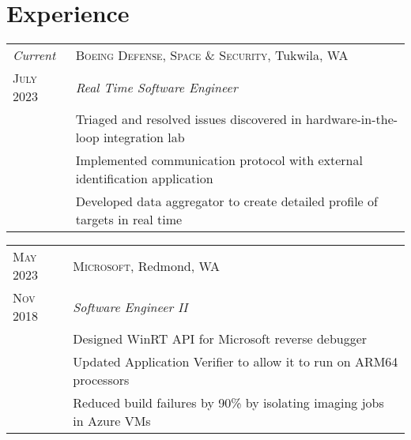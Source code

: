 \documentclass[a4paper,12pt]{article} %
\begin{document}
\pagestyle{empty} %


\par{\par}
\par{\par}

\vspace{10pt} %


\section{Experience}

\begin{tabular}{R{2.1cm}|L{13.0cm}}
\emph{Current} & \textsc{Boeing Defense, Space \& Security}, Tukwila, WA \\
\textsc{July 2023} & \emph{Real Time Software Engineer} \\
& \footnotesize{Triaged and resolved issues discovered in hardware-in-the-loop integration lab} \\
& \footnotesize{Implemented communication protocol with external identification application} \\
& \footnotesize{Developed data aggregator to create detailed profile of targets in real time} \\

\end{tabular}


\begin{tabular}{R{2.1cm}|L{13.0cm}}
\textsc{May 2023} & \textsc{Microsoft}, Redmond, WA \\
\textsc{Nov 2018} & \emph{Software Engineer II} \\
& \footnotesize{Designed WinRT API for Microsoft reverse debugger} \\
& \footnotesize{Updated Application Verifier to allow it to run on ARM64 processors} \\
& \footnotesize{Reduced build failures by 90\% by isolating imaging jobs in
  Azure VMs} \\
\end{tabular}
\end{document}
